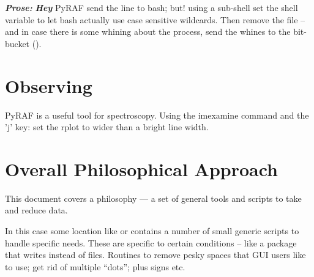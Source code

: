 \documentclass[letter,11pt,oneside]{article}
\begin{document}
\textbf{\emph{Prose:}} \textbf{\emph{Hey}} PyRAF send the line to bash; but! using a sub-shell
set {\color{verbcolor}{\verb#export#}} the {\color{verbcolor}{\verb#LC_ALL=C;#}}
shell variable to let bash actually use case sensitive wildcards. Then
{\color{verbcolor}{\verb#rm [a-z]_*fits 2> /dev/null;#}} remove the
file -- and in case there is some whining about the process, send the
whines to the bit-bucket ({\color{verbcolor}{\verb#/dev/null#}}).


\section{Observing}
PyRAF  is a useful tool for spectroscopy. Using
the imexamine command and the 'j' key: set the rplot to wider than a bright
line width. 


\clearpage
\section{Overall Philosophical Approach}

This document covers a philosophy --- a set of general tools and
scripts to take and reduce data.

In this case some location like {\color{verbcolor}{\verb#/opt/myobs/iraf/#}}
or {\color{verbcolor}{\verb#~/iraf/#}} contains a number of small generic
{\color{verbcolor}{\verb#.cl#}} scripts to handle specific needs. These
are specific to certain conditions -- like a package that writes {\color{verbcolor}{\verb#.fts#}}
instead of {\color{verbcolor}{\verb#.fits#}} files. Routines to remove pesky
spaces that GUI users like to use; get rid of multiple ``dots''; plus signs
etc. 
\end{document}
